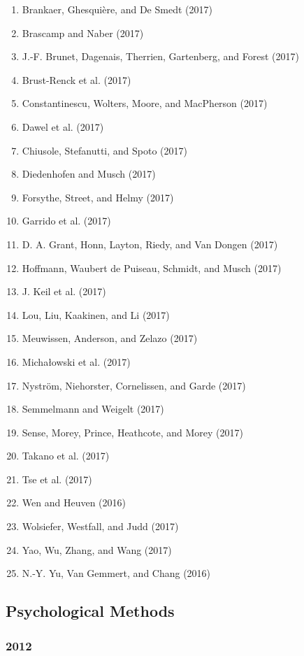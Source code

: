 \documentclass[english,man]{apa6}
\providecommand{\tightlist}{%
  \setlength{\itemsep}{0pt}\setlength{\parskip}{0pt}}
\theoremstyle{definition}
\theoremstyle{definition}
\theoremstyle{definition}
\theoremstyle{remark}
\begin{document}
\begin{enumerate}
\def\labelenumi{\arabic{enumi})}
\tightlist
\item
  Brankaer, Ghesquière, and De Smedt (2017)
\item
  Brascamp and Naber (2017)
\item
  J.-F. Brunet, Dagenais, Therrien, Gartenberg, and Forest (2017)
\item
  Brust-Renck et al. (2017)
\item
  Constantinescu, Wolters, Moore, and MacPherson (2017)
\item
  Dawel et al. (2017)
\item
  Chiusole, Stefanutti, and Spoto (2017)
\item
  Diedenhofen and Musch (2017)
\item
  Forsythe, Street, and Helmy (2017)
\item
  Garrido et al. (2017)
\item
  D. A. Grant, Honn, Layton, Riedy, and Van Dongen (2017)
\item
  Hoffmann, Waubert de Puiseau, Schmidt, and Musch (2017)
\item
  J. Keil et al. (2017)
\item
  Lou, Liu, Kaakinen, and Li (2017)
\item
  Meuwissen, Anderson, and Zelazo (2017)
\item
  Michałowski et al. (2017)
\item
  Nyström, Niehorster, Cornelissen, and Garde (2017)
\item
  Semmelmann and Weigelt (2017)
\item
  Sense, Morey, Prince, Heathcote, and Morey (2017)
\item
  Takano et al. (2017)
\item
  Tse et al. (2017)
\item
  Wen and Heuven (2016)
\item
  Wolsiefer, Westfall, and Judd (2017)
\item
  Yao, Wu, Zhang, and Wang (2017)
\item
  N.-Y. Yu, Van Gemmert, and Chang (2016)
\end{enumerate}

\subsection{Psychological Methods}\label{psychological-methods}

\subsubsection{2012}\label{section-34}
\end{document}
